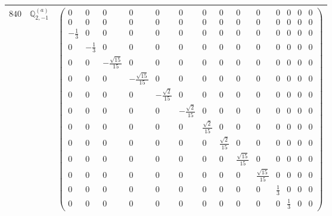 \documentclass[fleqn,8pt,landscape]{jsarticle}
\begin{document}
\begin{center}
\begin{longtable}{ccc}
$ 840 $ & $ \mathbb{Q}_{2,-1}^{(a)} $ & $ \begin{pmatrix} 0 & 0 & 0 & 0 & 0 & 0 & 0 & 0 & 0 & 0 & 0 & 0 & 0 & 0 \\ 0 & 0 & 0 & 0 & 0 & 0 & 0 & 0 & 0 & 0 & 0 & 0 & 0 & 0 \\ - \frac{1}{3} & 0 & 0 & 0 & 0 & 0 & 0 & 0 & 0 & 0 & 0 & 0 & 0 & 0 \\ 0 & - \frac{1}{3} & 0 & 0 & 0 & 0 & 0 & 0 & 0 & 0 & 0 & 0 & 0 & 0 \\ 0 & 0 & - \frac{\sqrt{15}}{15} & 0 & 0 & 0 & 0 & 0 & 0 & 0 & 0 & 0 & 0 & 0 \\ 0 & 0 & 0 & - \frac{\sqrt{15}}{15} & 0 & 0 & 0 & 0 & 0 & 0 & 0 & 0 & 0 & 0 \\ 0 & 0 & 0 & 0 & - \frac{\sqrt{2}}{15} & 0 & 0 & 0 & 0 & 0 & 0 & 0 & 0 & 0 \\ 0 & 0 & 0 & 0 & 0 & - \frac{\sqrt{2}}{15} & 0 & 0 & 0 & 0 & 0 & 0 & 0 & 0 \\ 0 & 0 & 0 & 0 & 0 & 0 & \frac{\sqrt{2}}{15} & 0 & 0 & 0 & 0 & 0 & 0 & 0 \\ 0 & 0 & 0 & 0 & 0 & 0 & 0 & \frac{\sqrt{2}}{15} & 0 & 0 & 0 & 0 & 0 & 0 \\ 0 & 0 & 0 & 0 & 0 & 0 & 0 & 0 & \frac{\sqrt{15}}{15} & 0 & 0 & 0 & 0 & 0 \\ 0 & 0 & 0 & 0 & 0 & 0 & 0 & 0 & 0 & \frac{\sqrt{15}}{15} & 0 & 0 & 0 & 0 \\ 0 & 0 & 0 & 0 & 0 & 0 & 0 & 0 & 0 & 0 & \frac{1}{3} & 0 & 0 & 0 \\ 0 & 0 & 0 & 0 & 0 & 0 & 0 & 0 & 0 & 0 & 0 & \frac{1}{3} & 0 & 0 \end{pmatrix} $ \\ \hline

\end{longtable}
\end{center}
\end{document}
